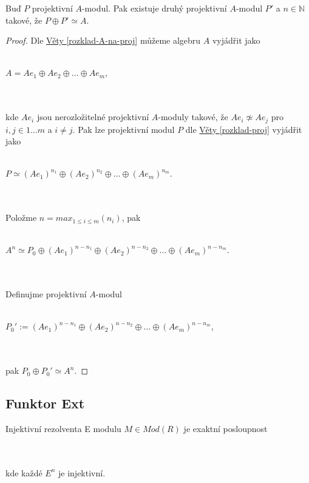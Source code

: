      \begin{thm}\label{rozklad-A-na-P}
       Buď $P$ projektivní $A$-modul. Pak existuje druhý projektivní $A$-modul $P'$ 
       a $n\in \mathbb N$ takové, že $P\oplus P'\simeq A$.
     \end{thm}
     \begin{proof}
       Dle \hyperref[rozklad-A-na-proj]{Věty \ref*{rozklad-A-na-proj}} můžeme algebru $A$ vyjádřit jako \\\\
        \centerline{$A=A e_1\oplus A e_2\oplus\ldots\oplus A e_m$,} \\\\
        kde $A e_i$ jsou 
        nerozložitelné projektivní $A$-moduly takové, že $Ae_i\not\simeq Ae_j$ 
        pro $i,j\in{1\ldots m}$ a $i\neq j$. Pak lze projektivní modul $P$  dle
        \hyperref[rozklad-proj]{Věty \ref*{rozklad-proj}} vyjádřit jako 
        \\\\
        \centerline{$P\simeq(A e_1)^{n_1}\oplus(A e_2)^{n_2}\oplus\ldots\oplus(A 
        e_m)^{n_m}$.} \\\\       
       Položme $n=max_{1\leq i \leq m}(n_i)$, pak \\\\
       \centerline{$
         A^n\simeq P_0
           \oplus(A e_1)^{n-n_1}
           \oplus(A e_2)^{n-n_2}
           \oplus\ldots
           \oplus(A e_m)^{n-n_m}
       $.} \\\\
       Definujme projektivní $A$-modul \\\\ 
       \centerline{$
         P_0':= 
           (A e_1)^{n-n_1}
           \oplus(A e_2)^{n-n_2}
           \oplus\ldots 
           \oplus(A e_m)^{n-n_m}
       $,} \\\\ 
       pak $P_0\oplus P_0'\simeq A^n$.
     \end{proof}
     
   \subsection{Funktor Ext}
   
     \begin{dfn}
       Injektivní rezolventa E modulu $M\in Mod(R)$ je exaktní posloupnost  \\
       \centerline{}\\\\
      kde každé $E^n$ je injektivní. 
    \end{dfn}
     
